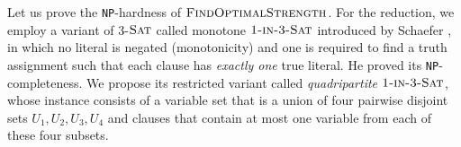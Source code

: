 \documentclass{article}
\theoremstyle{remark}
\theoremstyle{definition}
\newcommand{\findoptstrength}{\ensuremath{\mbox{\sc FindOptimalStrength}}}
\newcommand{\SAT}{\ensuremath{\mbox{\sc Sat}}}
\newcommand{\oneinthree}{\ensuremath{\mbox{\sc 1-in-3-\SAT}}}
\newcommand{\NP}{{\tt NP}}
\begin{document}
Let us prove the \NP-hardness of $\findoptstrength$. 
For the reduction, we employ a variant of 3-$\SAT$ called monotone $\oneinthree$ introduced by Schaefer \cite{Schaefer1978}, in which no literal is negated (monotonicity) and one is required to find a truth assignment such that each clause has {\it exactly one} true literal.
He proved its \NP-completeness. 
We propose its restricted variant called {\it quadripartite $\oneinthree$}, whose instance consists of a variable set that is a union of four pairwise disjoint sets $U_1, U_2, U_3, U_4$ and clauses that contain at most one variable from each of these four subsets. 
\end{document}
